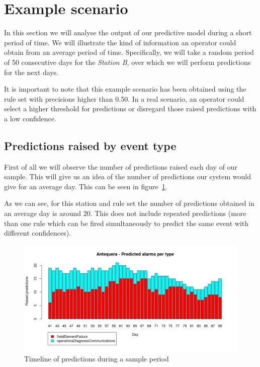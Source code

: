 \section{Example scenario}
\label{sec:scenario}

In this section we will analyse the output of our predictive model during a short period of time. We will illustrate the kind of information an operator could obtain from an average period of time. Specifically, we will take a random period of 50 consecutive days for the \emph{Station B}, over which we will perform predictions for the next days.

It is important to note that this example scenario has been obtained using the rule set with precisions higher than 0.50. In a real scenario, an operator could select a higher threshold for predictions or disregard those raised predictions with a low confidence.

\subsection{Predictions raised by event type}
First of all we will observe the number of predictions raised each day of our sample. This will give us an idea of the number of predictions our system would give for an average day. This can be seen in figure~\ref{fig:scenario_pred_categories}.

As we can see, for this station and rule set the number of predictions obtained in an average day is around 20. This does not include repeated predictions (more than one rule which can be fired simultaneously to predict the same event with different confidences).

\begin{figure}[hbtp]
\includegraphics[width=\textwidth]{img/scenario_pred_categories.png}
\caption{Timeline of predictions during a sample period} \label{fig:scenario_pred_categories}
\end{figure}

